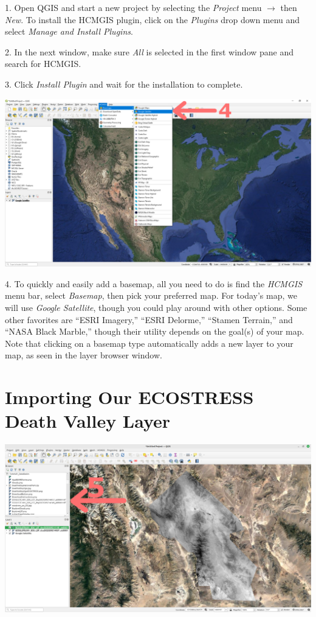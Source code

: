 \documentclass[oneside,a4paper,11pt,explicit]{book}
\begin{document}
1. Open QGIS and start a new project by selecting the \textit{Project} menu $\rightarrow$ then \textit{New}. To install the HCMGIS plugin, click on the \textit{Plugins} drop down menu and select \textit{Manage and Install Plugins}.

2. In the next window, make sure \textit{All} is selected in the first window pane and search for HCMGIS. 

3. Click \textit{Install Plugin} and wait for the installation to complete.

\vspace{1em}

\centerline{\includegraphics[width=\textwidth]{GoogleBasemap.png}}

\vspace{1em}

4. To quickly and easily add a basemap, all you need to do is find the \textit{HCMGIS} menu bar, select \textit{Basemap}, then pick your preferred map. For today's map, we will use \textit{Google Satellite}, though you could play around with other options. Some other favorites are ``ESRI Imagery,'' ``ESRI Delorme,'' ``Stamen Terrain,'' and ``NASA Black Marble,'' though their utility depends on the goal(s) of your map. Note that clicking on a basemap type automatically adds a new layer to your map, as seen in the layer browser window.

\section{Importing Our ECOSTRESS Death Valley Layer}

\vspace{1em}

\centerline{\includegraphics[width=\textwidth]{ImportLST.png}}
\end{document}
